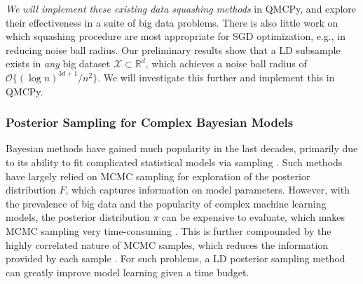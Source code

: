\documentclass[11pt]{NSFamsart}
\begin{document}
\textit{We will implement these existing data squashing methods} in QMCPy, and explore their effectiveness in a suite of big data problems. There is also little work on which squashing procedure are most appropriate for SGD optimization, e.g., in reducing noise ball radius. Our preliminary results show that a LD subsample exists in \textit{any} big dataset $\mathcal{X} \subset \mathbb{R}^d$, which achieves a noise ball radius of $\mathcal{O}\{(\log n)^{3d+1}/n^2\}$. We will investigate this further and implement this in QMCPy.

\subsubsection{Posterior Sampling for Complex Bayesian Models}

Bayesian methods have gained much popularity in the last decades, primarily due to its ability to fit complicated statistical models via sampling \cite{gelman2013bayesian}. Such methods have largely relied on MCMC sampling for exploration of the posterior distribution $F$, which captures information on model parameters. However, with the prevalence of big data and the popularity of complex machine learning models, the posterior distribution $\pi$ can be expensive to evaluate, which makes MCMC sampling very time-consuming \cite{joseph2015sequential}. This is further compounded by the highly correlated nature of MCMC samples, which reduces the information provided by each sample \citep{link2012thinning}. For such problems, a LD posterior sampling method can greatly improve model learning given a time budget.

\end{document}
